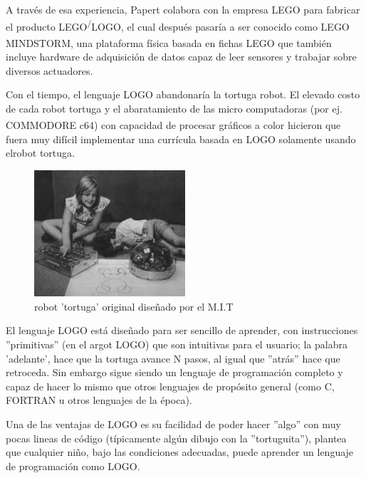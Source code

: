 A través de esa experiencia, Papert colabora con la empresa LEGO para fabricar el producto LEGO\textsuperscript/LOGO, el cual después pasaría a ser conocido como LEGO MINDSTORM\textsuperscript{\texttrademark}, una plataforma física basada en fichas LEGO\textsuperscript{\textregistered} que también incluye hardware de adquisición de datos capaz de leer sensores y trabajar sobre diversos actuadores.

Con el tiempo, el lenguaje LOGO abandonaría la tortuga robot. El elevado costo de cada robot tortuga y el abaratamiento de las micro computadoras (por ej. COMMODORE\textsuperscript{\textregistered} c64) con capacidad de procesar gráficos a color  hicieron que fuera muy difícil implementar una currícula basada en LOGO solamente usando elrobot tortuga.

\begin{figure}[htb]
  \begin{center}
    \includegraphics[width=0.5\textwidth]{figuras/logo_robot.jpg}
    \caption[Caption for LOF]{robot 'tortuga' original diseñado por el M.I.T}
    
    \label{fig:tortuga_mit}
  \end{center}
\end{figure}

El lenguaje LOGO está diseñado para ser sencillo de aprender, con instrucciones ''primitivas'' (en el argot LOGO) que son intuitivas para el usuario; la palabra 'adelante', hace que la tortuga avance N pasos,  al igual que ''atrás'' hace que retroceda. Sin embargo sigue siendo un lenguaje de programación completo y capaz de hacer lo mismo que otros lenguajes de propósito general  (como C, FORTRAN u otros lenguajes de la época). 

Una de las ventajas de LOGO es su facilidad de poder hacer ''algo'' con muy pocas lineas de código (típicamente algún dibujo con la ''tortuguita''), \cite{seymour_papert_desafio_1987} plantea que cualquier niño, bajo las condiciones adecuadas, puede aprender un lenguaje de programación como LOGO.

